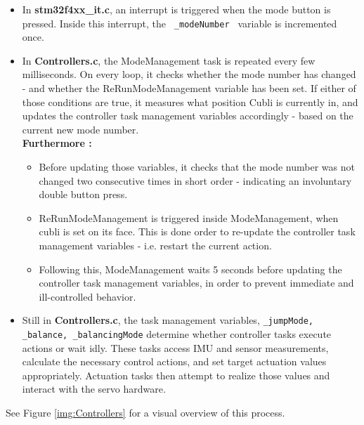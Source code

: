 \begin{itemize}
\item In \textbf{stm32f4xx\_it.c}, an interrupt is triggered when the mode button is pressed. Inside this interrupt, the \texttt{ \_modeNumber } variable is incremented once.

\item In \textbf{Controllers.c}, the ModeManagement task is repeated every few milliseconds. On every loop, it checks whether the mode number has changed - and whether the ReRunModeManagement variable has been set. If either of those conditions are true, it measures what position Cubli is currently in, and updates the controller task management variables accordingly - based on the current new mode number.\\

\textbf{Furthermore :} 
\begin{itemize}
\item[] Before updating those variables, it checks that the mode number was not changed two consecutive times in short order - indicating an involuntary double button press.
\item[] ReRunModeManagement is triggered inside ModeManagement, when cubli is set on its face. This is done order to re-update the controller task management variables - i.e. restart the current action. 
\item[] Following this, ModeManagement waits 5 seconds before updating the controller task management variables, in order to prevent immediate and ill-controlled behavior.
\end{itemize}

\item Still in \textbf{Controllers.c}, the task management variables, \texttt{\_jumpMode, \_balance, \_balancingMode} determine whether controller tasks execute actions or wait idly. These tasks access IMU and sensor measurements, calculate the necessary control actions, and set target actuation values appropriately. Actuation tasks then attempt to realize those values and interact with the servo hardware.
\end{itemize}

See Figure \ref{img:Controllers} for a visual overview of this process.

